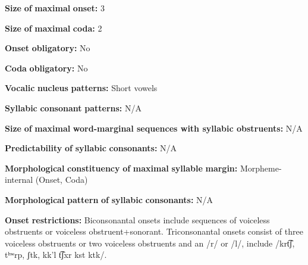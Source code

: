 \documentclass[output=paper]{langsci/langscibook}
\begin{document}
\begin{styleBody}
\textbf{Size} \textbf{of} \textbf{maximal} \textbf{onset:} 3
\end{styleBody}

\begin{styleBody}
\textbf{Size} \textbf{of} \textbf{maximal} \textbf{coda:} 2
\end{styleBody}

\begin{styleBody}
\textbf{Onset} \textbf{obligatory:} No
\end{styleBody}

\begin{styleBody}
\textbf{Coda} \textbf{obligatory:} No
\end{styleBody}

\begin{styleBody}
\textbf{Vocalic} \textbf{nucleus} \textbf{patterns:} Short vowels
\end{styleBody}

\begin{styleBody}
\textbf{Syllabic} \textbf{consonant} \textbf{patterns:} N/A
\end{styleBody}

\begin{styleBody}
\textbf{Size} \textbf{of} \textbf{maximal} \textbf{word{}-marginal sequences with syllabic obstruents:} N/A
\end{styleBody}

\begin{styleBody}
\textbf{Predictability} \textbf{of} \textbf{syllabic} \textbf{consonants:} N/A
\end{styleBody}

\begin{styleBody}
\textbf{Morphological} \textbf{constituency} \textbf{of} \textbf{maximal} \textbf{syllable} \textbf{margin:} Morpheme-internal (Onset, Coda)
\end{styleBody}

\begin{styleBody}
\textbf{Morphological} \textbf{pattern} \textbf{of} \textbf{syllabic} \textbf{consonants:} N/A
\end{styleBody}

\begin{styleBody}
\textbf{Onset} \textbf{restrictions:} Biconsonantal onsets include sequences of voiceless obstruents or voiceless obstruent+sonorant. Triconsonantal onsets consist of three voiceless obstruents or two voiceless obstruents and an /r/ or /l/, include /krt͡ʃ, tʰʷrp, ʃtk, kk'l t͡ʃxr kst ktk/.
\end{styleBody}
\end{document}
